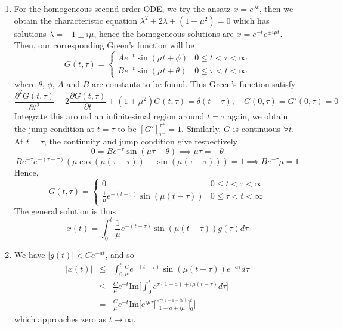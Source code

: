 \documentclass[a4paper]{article}
\begin{document}
\begin{ans}
\begin{enumerate}[label=(\alph*)]
\begin{enumerate}[label=(\roman*)]
    \item For the homogeneous second order ODE, we try the ansatz $x=e^{\lambda t}$, then we obtain the characteristic equation $\lambda^2+2\lambda+(1+\mu^2)=0$ which has solutions $\lambda=-1\pm i\mu$, hence the homogeneous solutions are $x=e^{-t}e^{\pm i\mu t}$. Then, our corresponding Green's function will be
        $$ G(t,\tau)=
\left\{
        \begin{array}{ll}
      Ae^{-t}\sin(\mu t+\phi) & 0\leq t<\tau<\infty\\
      Be^{-t}\sin(\mu t+\theta) &0\leq\tau< t<\infty
        \end{array}
    \right.$$
    where $\theta$, $\phi$, $A$ and $B$ are constants to be found. This Green's function satisfy
    $$\frac{\partial^2G(t,\tau)}{\partial t^2}+2\frac{\partial G(t,\tau)}{\partial t}+(1+\mu^2)G(t,\tau)=\delta(t-\tau),\quad G(0,\tau)=G'(0,\tau)=0$$
    Integrate this around an infinitesimal region around $t=\tau$ again, we obtain the jump condition at $t=\tau$ to be $[G']_{\tau^-}^{\tau^+}=1$. Similarly, $G$ is continuous $\forall t$. At $t=\tau$, the continuity and jump condition give respectively $$0=Be^{-\tau}\sin(\mu\tau+\theta)\implies\mu\tau=-\theta$$
    $$B e^{-\tau} e^{-(\tau-\tau)}(\mu\cos(\mu(\tau-\tau))-\sin(\mu(\tau-\tau)))=1\implies Be^{-\tau}\mu=1$$
    Hence, 
     $$ G(t,\tau)=
\left\{
        \begin{array}{ll}
      0 & 0\leq t<\tau<\infty\\
      \frac{1}{\mu}e^{-(t-\tau)}\sin(\mu(t-\tau)) &0\leq\tau< t<\infty
        \end{array}
    \right.$$
    The general solution is thus
$$x(t)=\int_0^t\frac{1}{\mu}e^{-(t-\tau)}\sin(\mu(t-\tau))g(\tau)d\tau$$
\item We have $|g(t)|<Ce^{-at}$, and so 
\begin{eqnarray}
|x(t)|&\leq&\int_0^t\frac{C}{\mu}e^{-(t-\tau)}\sin(\mu(t-\tau))e^{-a\tau}d\tau\nonumber\\&\leq&\frac{C}{\mu}e^{-t}\text{Im}\bigg[\int_0^te^{\tau(1-a)+i\mu(t-\tau)}d\tau\bigg]\nonumber\\&=&\frac{C}{\mu}e^{-t}\text{Im}\bigg[e^{i\mu\tau}\bigg[\frac{e^{\tau(1-a-i\mu)}}{1-a+i\mu}\bigg]_0^t\bigg]\nonumber
\end{eqnarray}
which approaches zero as $t\rightarrow\infty$.
\end{enumerate}
\end{enumerate}
\end{ans}
\newpage
\end{document}
